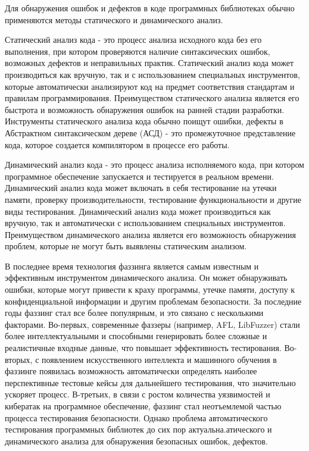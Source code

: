 Для обнаружения ошибок и дефектов в коде программных библиотеках обычно применяются методы статического и динамического анализ. 

Статический анализ кода - это процесс анализа исходного кода без его выполнения, при котором проверяются наличие синтаксических ошибок, возможных дефектов и неправильных практик. Статический анализ кода может производиться как вручную, так и с использованием специальных инструментов, которые автоматически анализируют код на предмет соответствия стандартам и правилам программирования. Преимуществом статического анализа является его быстрота и возможность обнаружения ошибок на ранней стадии разработки. Инструменты статического анализа кода обычно поищут ошибки, дефекты в Абстрактном синтаксическом дереве (АСД) - это промежуточное представление кода, которое создается компилятором в процессе его работы.

Динамический анализ кода - это процесс анализа исполняемого кода, при котором программное обеспечение запускается и тестируется в реальном времени. Динамический анализ кода может включать в себя тестирование на утечки памяти, проверку производительности, тестирование функциональности и другие виды тестирования. Динамический анализ кода может производиться как вручную, так и автоматически с использованием специальных инструментов. Преимуществом динамического анализа является его возможность обнаружения проблем, которые не могут быть выявлены статическим анализом. 

В последнее время технология фаззинга является самым известным и эффективным инструментом динамического анализа. Он может обнаруживать ошибки, которые могут привести к краху программы, утечке памяти, доступу к конфиденциальной информации и другим проблемам безопасности. За последние годы фаззинг стал все более популярным, и это связано с несколькими факторами. Во-первых, современные фаззеры (например, AFL, LibFuzzer) стали более интеллектуальными и способными генерировать более сложные и реалистичные входные данные, что повышает эффективность тестирования. Во-вторых, с появлением искусственного интеллекта и машинного обучения в фаззинге появилась возможность автоматически определять наиболее перспективные тестовые кейсы для дальнейшего тестирования, что значительно ускоряет процесс. В-третьих, в связи с ростом количества уязвимостей и кибератак на программное обеспечение, фаззинг стал неотъемлемой частью процесса тестирования безопасности. Однако проблема автоматического тестирования программных библиотек до сих пор актуальна.атического и динамического анализа для обнаружения безопасных ошибок, дефектов.

